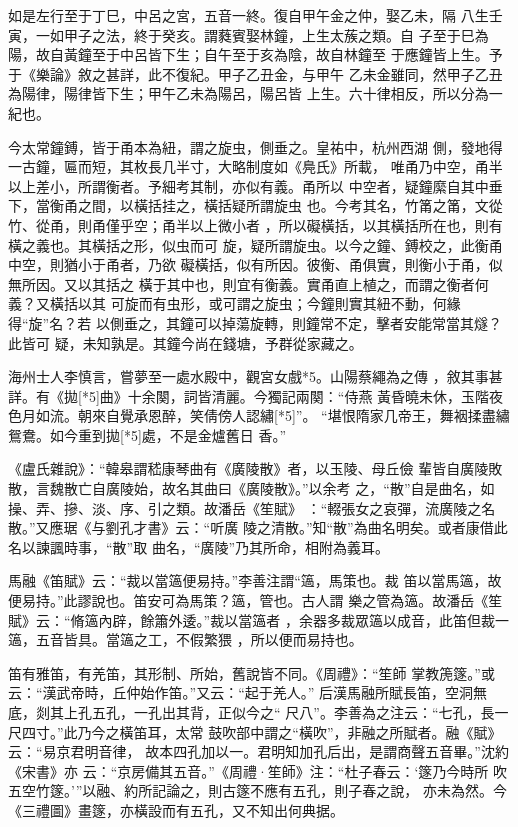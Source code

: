 \documentclass{ctexart}
\begin{document}
如是左行至于丁巳，中呂之宮，五音一終。復自甲午金之仲，娶乙未，隔 八生壬寅，一如甲子之法，終于癸亥。謂蕤賓娶林鐘，上生太蔟之類。自 子至于巳為陽，故自黃鐘至于中呂皆下生；自午至于亥為陰，故自林鐘至 于應鐘皆上生。予于《樂論》敘之甚詳，此不復紀。甲子乙丑金，与甲午 乙未金雖同，然甲子乙丑為陽律，陽律皆下生；甲午乙未為陽呂，陽呂皆 上生。六十律相反，所以分為一紀也。

今太常鐘鎛，皆于甬本為紐，謂之旋虫，側垂之。皇祐中，杭州西湖 側，發地得一古鐘，匾而短，其枚長几半寸，大略制度如《鳧氏》所載， 唯甬乃中空，甬半以上差小，所謂衡者。予細考其制，亦似有義。甬所以 中空者，疑鐘縻自其中垂下，當衡甬之間，以橫括挂之，橫括疑所謂旋虫 也。今考其名，竹筩之筩，文從竹、從甬，則甬僅乎空；甬半以上微小者 ，所以礙橫括，以其橫括所在也，則有橫之義也。其橫括之形，似虫而可 旋，疑所謂旋虫。以今之鐘、鎛校之，此衡甬中空，則猶小于甬者，乃欲 礙橫括，似有所因。彼衡、甬俱實，則衡小于甬，似無所因。又以其括之 橫于其中也，則宜有衡義。實甬直上植之，而謂之衡者何義？又橫括以其 可旋而有虫形，或可謂之旋虫；今鐘則實其紐不動，何緣得``旋''名？若 以側垂之，其鐘可以掉蕩旋轉，則鐘常不定，擊者安能常當其燧？此皆可 疑，未知孰是。其鐘今尚在錢塘，予群從家藏之。

海州士人李慎言，嘗夢至一處水殿中，觀宮女戲*5。山陽蔡繩為之傳 ，敘其事甚詳。有《拋[*5]曲》十余闋，詞皆清麗。今獨記兩闋：``侍燕 黃昏曉未休，玉階夜色月如流。朝來自覺承恩醉，笑倩傍人認繡[*5]''。 ``堪恨隋家几帝王，舞裀揉盡繡鴛鴦。如今重到拋[*5]處，不是金爐舊日 香。''

《盧氏雜說》：``韓皋謂嵇康琴曲有《廣陵散》者，以玉陵、母丘儉 輩皆自廣陵敗散，言魏散亡自廣陵始，故名其曲曰《廣陵散》。''以余考 之，``散''自是曲名，如操、弄、摻、淡、序、引之類。故潘岳《笙賦》 ：``輟張女之哀彈，流廣陵之名散。''又應琚《与劉孔才書》云：``听廣 陵之清散。''知``散''為曲名明矣。或者康借此名以諫諷時事，``散''取 曲名，``廣陵''乃其所命，相附為義耳。

馬融《笛賦》云：``裁以當簻便易持。''李善注謂``簻，馬策也。裁 笛以當馬簻，故便易持。''此謬說也。笛安可為馬策？簻，管也。古人謂 樂之管為簻。故潘岳《笙賦》云：``脩簻內辟，餘簫外逶。''裁以當簻者 ，余器多裁眾簻以成音，此笛但裁一簻，五音皆具。當簻之工，不假繁猥 ，所以便而易持也。

笛有雅笛，有羌笛，其形制、所始，舊說皆不同。《周禮》：``笙師 掌教箎篴。''或云：``漢武帝時，丘仲始作笛。''又云：``起于羌人。'' 后漢馬融所賦長笛，空洞無底，剡其上孔五孔，一孔出其背，正似今之`` 尺八''。李善為之注云：``七孔，長一尺四寸。''此乃今之橫笛耳，太常 鼓吹部中謂之``橫吹''，非融之所賦者。融《賦》云：``易京君明音律， 故本四孔加以一。君明知加孔后出，是謂商聲五音畢。''沈約《宋書》亦 云：``京房備其五音。''《周禮·笙師》注：``杜子春云：`篴乃今時所 吹五空竹篴。'''以融、約所記論之，則古篴不應有五孔，則子春之說， 亦未為然。今《三禮圖》畫篴，亦橫設而有五孔，又不知出何典据。
\end{document}
